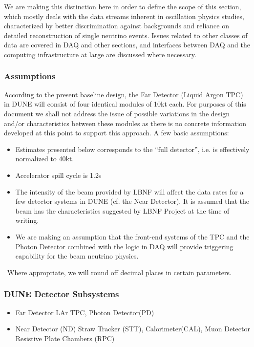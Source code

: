 We are making this distinction here in order to define the scope of this section, which mostly deals with the data streams inherent in
oscillation physics studies, characterized by better discrimination against backgrounds and reliance on detailed reconstruction of single
neutrino events. Issues related to other classes of data are covered in DAQ and other sections, and interfaces between DAQ and the computing
infrastructure at large are discussed where necessary.

\subsubsection{Assumptions}
According to the present baseline design, the Far Detector (Liquid Argon TPC) in DUNE will consist of four identical modules of 10kt each.
For purposes of this document we shall not address the issue of possible variations in the design and/or characteristics between
these modules as there is no concrete information developed at this point to support this approach. A few basic assumptions:
\begin{itemize}
\item Estimates presented below corresponds to the ``full detector'', i.e. is effectively normalized to 40kt.
\item Accelerator spill cycle is 1.2s
\item The intensity of the beam provided by LBNF will affect the data rates for a few detector systems in DUNE (cf. the Near Detector).
It is assumed that the beam has the characteristics suggested by LBNF Project at the time of writing.
\item We are making an assumption that the front-end systems of the TPC and the Photon Detector combined with the logic in DAQ
will provide triggering capability for the beam neutrino physics.
\end{itemize}
\
Where appropriate, we will round off decimal places in certain parameters.

\subsubsection{DUNE Detector Subsystems}
\begin{itemize}
\item Far Detector LAr TPC, Photon Detector(PD)
\item Near Detector (ND) Straw Tracker (STT), Calorimeter(CAL), Muon Detector Resistive Plate Chambers (RPC)
\end{itemize}

